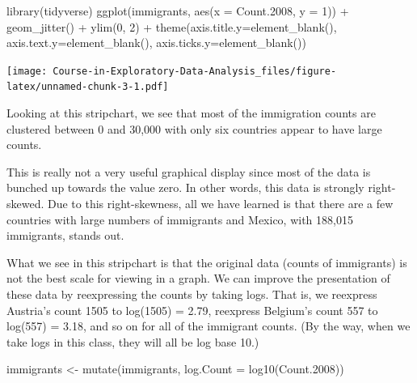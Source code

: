 \documentclass[
]{book}
\newenvironment{Shaded}{\begin{snugshade}}{\end{snugshade}}
\newcommand{\AttributeTok}[1]{\textcolor[rgb]{0.77,0.63,0.00}{#1}}
\newcommand{\DecValTok}[1]{\textcolor[rgb]{0.00,0.00,0.81}{#1}}
\newcommand{\FloatTok}[1]{\textcolor[rgb]{0.00,0.00,0.81}{#1}}
\newcommand{\FunctionTok}[1]{\textcolor[rgb]{0.00,0.00,0.00}{#1}}
\newcommand{\NormalTok}[1]{#1}
\newcommand{\OtherTok}[1]{\textcolor[rgb]{0.56,0.35,0.01}{#1}}
\newcommand{\SpecialCharTok}[1]{\textcolor[rgb]{0.00,0.00,0.00}{#1}}
\begin{document}
\begin{Shaded}
\begin{Highlighting}[]
\FunctionTok{library}\NormalTok{(tidyverse)}
\FunctionTok{ggplot}\NormalTok{(immigrants,}
       \FunctionTok{aes}\NormalTok{(}\AttributeTok{x =}\NormalTok{ Count}\FloatTok{.2008}\NormalTok{, }\AttributeTok{y =} \DecValTok{1}\NormalTok{)) }\SpecialCharTok{+}
     \FunctionTok{geom\_jitter}\NormalTok{() }\SpecialCharTok{+} \FunctionTok{ylim}\NormalTok{(}\DecValTok{0}\NormalTok{, }\DecValTok{2}\NormalTok{) }\SpecialCharTok{+}
     \FunctionTok{theme}\NormalTok{(}\AttributeTok{axis.title.y=}\FunctionTok{element\_blank}\NormalTok{(),}
     \AttributeTok{axis.text.y=}\FunctionTok{element\_blank}\NormalTok{(),}
     \AttributeTok{axis.ticks.y=}\FunctionTok{element\_blank}\NormalTok{())}
\end{Highlighting}
\end{Shaded}

\texttt{[image: Course-in-Exploratory-Data-Analysis\_files/figure-latex/unnamed-chunk-3-1.pdf]}

Looking at this stripchart, we see that most of the immigration counts are clustered between 0 and 30,000 with only six countries appear to have large counts.

This is really not a very useful graphical display since most of the data is bunched up towards the value zero. In other words, this data is strongly right-skewed. Due to this right-skewness, all we have learned is that there are a few countries with large numbers of immigrants and Mexico, with 188,015 immigrants, stands out.

What we see in this stripchart is that the original data (counts of immigrants) is not the best scale for viewing in a graph. We can improve the presentation of these data by reexpressing the counts by taking logs. That is, we reexpress Austria's count 1505 to log(1505) = 2.79, reexpress Belgium's count 557 to log(557) = 3.18, and so on for all of the immigrant counts. (By the way, when we take logs in this class, they will all be log base 10.)

\begin{Shaded}
\begin{Highlighting}[]
\NormalTok{immigrants }\OtherTok{\textless{}{-}} \FunctionTok{mutate}\NormalTok{(immigrants,}
                     \AttributeTok{log.Count =} \FunctionTok{log10}\NormalTok{(Count}\FloatTok{.2008}\NormalTok{))}
\end{Highlighting}
\end{Shaded}
\end{document}
